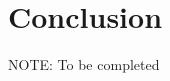 \documentclass[journal,comsoc]{IEEEtran}
\begin{document}
%




\section{Conclusion}

NOTE: To be completed





\end{document}
